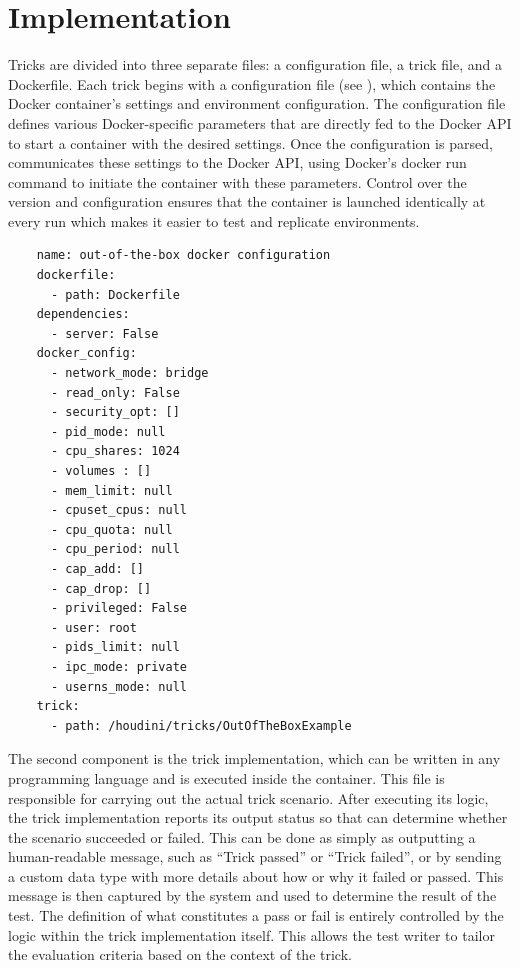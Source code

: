 \section{Implementation}
\label{sec:implementation}

Tricks are divided into three separate files: a configuration file, a trick file, and a Dockerfile. Each \houdini trick begins with a configuration file (see ), which contains the Docker container's settings and environment configuration. The configuration file defines various Docker-specific parameters that are directly fed to the Docker API to start a container with the desired settings. Once the configuration is parsed, \houdini communicates these settings to the Docker API, using Docker's docker run command to initiate the container with these parameters. Control over the version and configuration ensures that the container is launched identically at every run which makes it easier to test and replicate environments.


\begin{listing}[h]
  \caption{Configuration file for a default Docker out-of-the-box security settings applied when a container is launched.}
  \label{lst:configuration-file}
  \begin{verbatim}
    name: out-of-the-box docker configuration
    dockerfile:
      - path: Dockerfile
    dependencies:
      - server: False
    docker_config: 
      - network_mode: bridge
      - read_only: False
      - security_opt: []
      - pid_mode: null
      - cpu_shares: 1024
      - volumes : []
      - mem_limit: null
      - cpuset_cpus: null
      - cpu_quota: null
      - cpu_period: null
      - cap_add: []
      - cap_drop: []
      - privileged: False
      - user: root
      - pids_limit: null
      - ipc_mode: private
      - userns_mode: null
    trick:
      - path: /houdini/tricks/OutOfTheBoxExample
  \end{verbatim}
\end{listing}



The second component is the trick implementation, which can be written in any programming language and is executed inside the container. This file is responsible for carrying out the actual trick scenario. After executing its logic, the trick implementation reports its output status so that \houdini can determine whether the scenario succeeded or failed. This can be done as simply as outputting a human-readable message, such as ``Trick passed'' or ``Trick failed'', or by sending a custom data type with more details about how or why it failed or passed. This message is then captured by the system and used to determine the result of the test. The definition of what constitutes a pass or fail is entirely controlled by the logic within the trick implementation itself. This allows the test writer to tailor the evaluation criteria based on the context of the trick.


